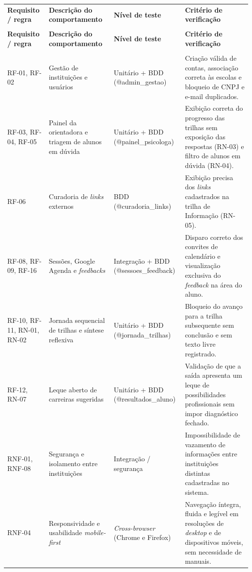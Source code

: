 \begin{apendicesenv}
{\ABNTEXfontereduzida
\renewcommand{\arraystretch}{1.25}
\begin{xltabular}{\textwidth}{|>{\raggedright\arraybackslash}p{2.1cm}|>{\raggedright\arraybackslash}p{3.3cm}|>{\raggedright\arraybackslash}p{3.4cm}|>{\raggedright\arraybackslash}X|}
 \\[0.3em]
\hline
\textbf{Requisito / regra} & \textbf{Descrição do comportamento} & \textbf{Nível de teste} & \textbf{Critério de verificação} \\
\hline
\endfirsthead
{} \\
\hline
\textbf{Requisito / regra} & \textbf{Descrição do comportamento} & \textbf{Nível de teste} & \textbf{Critério de verificação} \\
\hline
\endhead
{} \\
\endfoot
\endlastfoot
RF-01, RF-02 & Gestão de instituições e usuários & Unitário + BDD (@admin\_gestao) & Criação válida de contas, associação correta às escolas e bloqueio de CNPJ e e-mail duplicados. \\
\hline
RF-03, RF-04, RF-05 & Painel da orientadora e triagem de alunos em dúvida & Unitário + BDD (@painel\_psicologa) & Exibição correta do progresso das trilhas sem exposição das respostas (RN-03) e filtro de alunos em dúvida (RN-04). \\
\hline
RF-06 & Curadoria de \textit{links} externos & BDD (@curadoria\_links) & Exibição precisa dos \textit{links} cadastrados na trilha de Informação (RN-05). \\
\hline
RF-08, RF-09, RF-16 & Sessões, Google Agenda e \textit{feedbacks} & Integração + BDD (@sessoes\_feedback) & Disparo correto dos convites de calendário e visualização exclusiva do \textit{feedback} na área do aluno. \\
\hline
RF-10, RF-11, RN-01, RN-02 & Jornada sequencial de trilhas e síntese reflexiva & Unitário + BDD (@jornada\_trilhas) & Bloqueio do avanço para a trilha subsequente sem conclusão e sem texto livre registrado. \\
\hline
RF-12, RN-07 & Leque aberto de carreiras sugeridas & Unitário + BDD (@resultados\_aluno) & Validação de que a saída apresenta um leque de possibilidades profissionais sem impor diagnóstico fechado. \\
\hline
RNF-01, RNF-08 & Segurança e isolamento entre instituições & Integração / segurança & Impossibilidade de vazamento de informações entre instituições distintas cadastradas no sistema. \\
\hline
RNF-04 & Responsividade e usabilidade \textit{mobile-first} & \textit{Cross-browser} (Chrome e Firefox) & Navegação íntegra, fluida e legível em resoluções de \textit{desktop} e de dispositivos móveis, sem necessidade de manuais. \\
\hline
\end{xltabular}
}


\end{apendicesenv}

